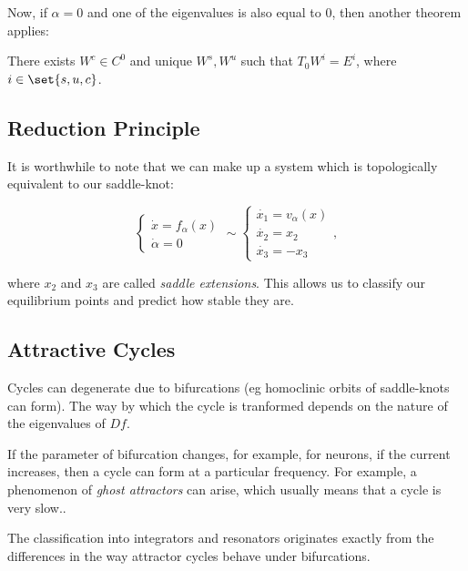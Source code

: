 \documentclass[11pt]{scrartcl}
\begin{document}
Now, if $\alpha = 0$ and one of the eigenvalues is also equal to 0,
then another theorem applies:

\begin{theorem}
  There exists $W^{c} \in C^{0}$ and unique $W^{s}, W^{u}$ such that
  $T_{0}W^{i} = E^{i}$, where $i\in \set{s, u, c}$.
\end{theorem}

\subsection{Reduction Principle}

It is worthwhile to note that we can make up a system which is
topologically equivalent to our saddle-knot:


\begin{equation*}
  \begin{cases}
    \dot{x} = f_{\alpha}(x)\\
    \dot{\alpha} = 0
  \end{cases} \sim
  \begin{cases}
    \dot{x_{1}} = v_{\alpha}(x)\\
    \dot{x_{2}} = x_{2}\\
    \dot{x_{3}} = - x_{3}
  \end{cases},
\end{equation*}

where $x_{2}$ and $x_{3}$ are called \textit{saddle extensions}. This
allows us to classify our equilibrium points and predict how stable
they are.

\subsection{Attractive Cycles}

Cycles can degenerate due to bifurcations (eg homoclinic orbits of
saddle-knots can form). The way by which the cycle is tranformed
depends on the nature of the eigenvalues of $Df$.

If the parameter of bifurcation changes, for example, for neurons, if
the current increases, then a cycle can form at a particular
frequency. For example, a phenomenon of \textit{ghost attractors} can
arise, which usually means that a cycle is very slow..

The classification into integrators and resonators originates exactly
from the differences in the way attractor cycles behave under
bifurcations.
\end{document}
